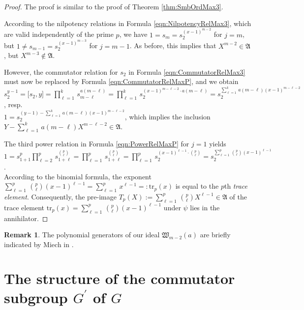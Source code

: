 \documentclass{amsart}
\theoremstyle{definition}
\newtheorem{remark}{Remark}[section]
\numberwithin{equation}{section}
\begin{document}
\begin{proof}
The proof is similar to the proof of Theorem
\ref{thm:SmbOrdMax3}.

According to the nilpotency relations in Formula
\eqref{eqn:NilpotencyRelMax3},
which are valid independently of the prime \(p\),
we have
\(1=s_m=s_2^{(x-1)^{m-2}}\) for \(j=m\),
but
\(1\ne s_{m-1}=s_2^{(x-1)^{m-3}}\) for \(j=m-1\).
As before, this implies that
\(X^{m-2}\in\mathfrak{A}\), but \(X^{m-3}\notin\mathfrak{A}\).

However, the commutator relation for \(s_2\) in Formula
\eqref{eqn:CommutatorRelMax3}
must now be replaced by Formula
\eqref{eqn:CommutatorRelMaxP},
and we obtain\\
\(s_2^{y-1}=\lbrack s_2,y\rbrack=\prod_{\ell=1}^k\,s_{m-\ell}^{a(m-\ell)}
=\prod_{\ell=1}^k\,s_2^{(x-1)^{m-\ell-2}\cdot a(m-\ell)}=s_2^{\sum_{\ell=1}^k\,a(m-\ell)(x-1)^{m-\ell-2}}\),
resp.\\
\(1=s_2^{(y-1)-\sum_{\ell=1}^k\,a(m-\ell)(x-1)^{m-\ell-2}}\),
which implies the inclusion
\(Y-\sum_{\ell=1}^k\,a(m-\ell)X^{m-\ell-2}\in\mathfrak{A}\).

The third power relation in Formula
\eqref{eqn:PowerRelMaxP}
for \(j=1\) yields\\
\(1=s_{1+1}^p\prod_{\ell=2}^p\,s_{1+\ell}^{\binom{p}{\ell}}=\prod_{\ell=1}^p\,s_{1+\ell}^{\binom{p}{\ell}}
=\prod_{\ell=1}^p\,s_2^{(x-1)^{\ell-1}\cdot\binom{p}{\ell}}
=s_2^{\sum_{\ell=1}^p\,\binom{p}{\ell}(x-1)^{\ell-1}}\).\\
According to the binomial formula, the exponent
\(\sum_{\ell=1}^p\,\binom{p}{\ell}(x-1)^{\ell-1}=\sum_{\ell=1}^p\,x^{\ell-1}=:\mathrm{tr}_p(x)\)
is equal to the \(p\)th \textit{trace element}.
Consequently, the pre-image \(T_p(X):=\sum_{\ell=1}^p\,\binom{p}{\ell}X^{\ell-1}\in\mathfrak{A}\)
of the trace element \(\mathrm{tr}_p(x)=\sum_{\ell=1}^p\,\binom{p}{\ell}(x-1)^{\ell-1}\)
under \(\psi\) lies in the annihilator.
\end{proof}

\begin{remark}
\label{rmk:MaxSmbOrdP}
The polynomial generators of our ideal \(\mathfrak{W}_{m-2}(a)\)
are briefly indicated by Miech in
\cite[p. 94]{Mi2}.
\end{remark}



\section{The structure of the commutator subgroup \(G^\prime\) of \(G\)}
\label{s:StrComSbg}
\end{document}
